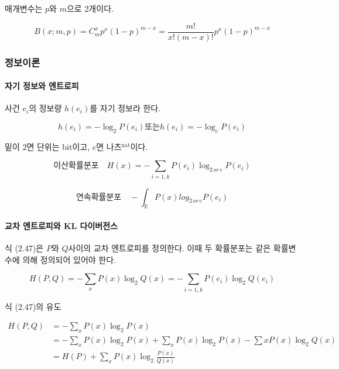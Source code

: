 \documentclass [12pt] {oblivoir}
\let\oldsubsubsection=\subsubsection
\renewcommand{\subsubsection}
{
  \filbreak
  \oldsubsubsection
}
\begin{document}
매개변수는 $p$와 $m$으로 2개이다.

\begin{equation} \tag{2.43}
  B(x; m, p) = C_{m}^{x}p^{x}(1 - p)^{m - x} = \frac{m!}{x!(m - x)!}p^{x}(1 - p)^{m - x}
\end{equation}

\subsubsection{정보이론}

\paragraph*{자기 정보와 엔트로피}\mbox{}

사건 $e_{i}$의 정보량 $h(e_{i})$를 자기 정보라 한다.

\begin{equation} \tag{2.44}
  h(e_{i}) = -\log_{2}P(e_{i}) \text{또는} h(e_{i}) = -\log_{e}P(e_{i})
\end{equation}

밑이 2면 단위는 bit이고, $e$면 나츠$^{\text{nat}}$이다.

\begin{equation} \tag{2.45}
  \text{이산확률분포} \quad H(x) = -\sum_{i=1, k}P(e_{i})\log_{2\,or\,e}P(e_{i})
\end{equation}

\begin{equation} \tag{2.46}
  \text{연속확률분포} \quad -\int_{\mathds{R}}P(x)log_{2\,or\,e}P(e_{i})
\end{equation}

\paragraph*{교차 엔트로피와 KL 다이버전스}\mbox{}

식 (2.47)은 $P$와 $Q$사이의 교차 엔트로피를 정의한다. 이때 두 확률분포는 같은 확률변수에 의해 정의되어 있어야 한다.

\begin{equation} \tag{2.47}
  H(P, Q) = -\sum_{x}P(x)\log_{2}Q(x) = -\sum_{i=1,k}P(e_{i})\log_{2}Q(e_{i})
\end{equation}

식 (2.47)의 유도

\begin{align*}
  H(P, Q) &= -\sum_{x}P(x)\log_{2}P(x) \\
          &= -\sum_{x}P(x)\log_{2}P(x) + \sum_{x}P(x)\log_{2}P(x) - \sum{x}P(x)\log_{2}Q(x) \\
          &= H(P) + \sum_{x}P(x)\log_{2}\frac{P(x)}{Q(x)}
\end{align*}
\end{document}
